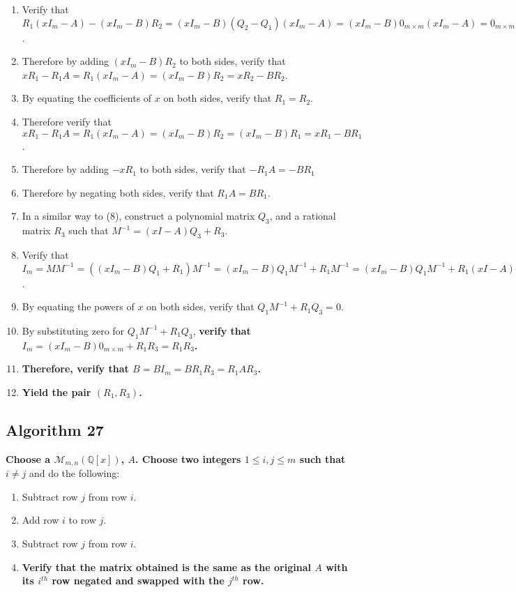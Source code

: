 \documentclass[twocolumn]{article}
\begin{document}
\begin{enumerate}
				\item Verify that $R_1(xI_m-A)-(xI_m-B)R_2=(xI_m-B)(Q_2-Q_1)(xI_m-A)=(xI_m-B)0_{m\times m}(xI_m-A)=0_{m\times m}$.
				\item Therefore by adding $(xI_m-B)R_2$ to both sides, verify that $xR_1-R_1A=R_1(xI_m-A)=(xI_m-B)R_2=xR_2-BR_2$.
				\item By equating the coefficients of $x$ on both sides, verify that $R_1=R_2$.
				\item Therefore verify that $xR_1-R_1A=R_1(xI_m-A)=(xI_m-B)R_2=(xI_m-B)R_1=xR_1-BR_1$.
				\item Therefore by adding $-xR_1$ to both sides, verify that $-R_1A=-BR_1$
				\item Therefore by negating both sides, verify that $R_1A=BR_1$.
				\item In a similar way to (8), construct a polynomial matrix $Q_3$, and a rational matrix $R_3$ such that $M^{-1}=(xI-A)Q_3+R_3$.
				\item Verify that $I_m=MM^{-1}=((xI_m-B)Q_1+R_1)M^{-1}=(xI_m-B)Q_1M^{-1}+R_1M^{-1}=(xI_m-B)Q_1M^{-1}+R_1(xI-A)Q_3+R_1R_3=(xI_m-B)Q_1M^{-1}+(xI-B)R_1Q_3+R_1R_3=(xI_m-B)(Q_1M^{-1}+R_1Q_3)+R_1R_3$.
				\item By equating the powers of $x$ on both sides, verify that $Q_1M^{-1}+R_1Q_3=0$.
				\item By substituting zero for $Q_1M^{-1}+R_1Q_3$, \textbf{verify that $I_m=(xI_m-B)0_{m\times m}+R_1R_3=R_1R_3$.}
				\item \textbf{Therefore, verify that $B=BI_m=BR_1R_3=R_1AR_3$.}
				\item \textbf{Yield the pair $(R_1,R_3)$.}
			\end{enumerate}
		\subsection{Algorithm 27}\label{sec:algorithm 27}
			\textbf{Choose a $\mathcal{M}_{m,n}(\mathbb{Q}[x])$, $A$. Choose two integers $1\le i,j\le m$ such that $i\ne j$} and do the following:
			\begin{enumerate}
				\item Subtract row $j$ from row $i$.
				\item Add row $i$ to row $j$.
				\item Subtract row $j$ from row $i$.
				\item \textbf{Verify that the matrix obtained is the same as the original $A$ with its $i^{th}$ row negated and swapped with the $j^{th}$ row.}
			\end{enumerate}
\end{document}
